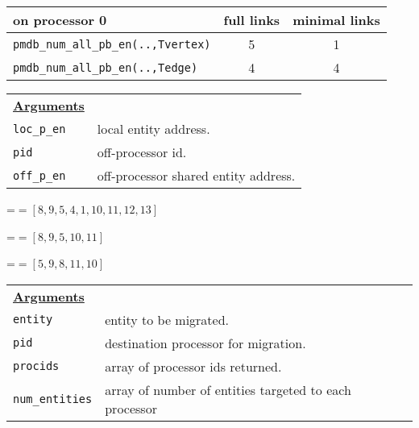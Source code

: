{\newpage
\clearpage
\samepage \begin{tabular}{|l|c|c|} \hline
on processor 0      & full links  & minimal links  \\  \hline \hline
{\tt pmdb\_num\_all\_pb\_en(..,Tvertex)} &  5  & 1   \\  \hline
{\tt pmdb\_num\_all\_pb\_en(..,Tedge)}   &  4  & 4   \\  \hline
\end{tabular}
}

{\newpage
\clearpage
\samepage \begin{tabular}{p{1.0in}p{4.9in}}
{\bf \underline{Arguments}} & \\  

{\tt loc\_p\_en}   &  local entity address. \\  
{\tt pid}          &  off-processor id. \\  
{\tt off\_p\_en}   &   off-processor shared entity address. \\  

\end{tabular}
}

{\newpage
\clearpage
\samepage \begin{figure}[htb]
\centerline{
\vbox{}
}
\label{lab_fig_gs}

\end{figure}
}

{\newpage
\clearpage
\samepage \setbox\sizebox=\hbox{$= [8,9,5,4,1,10,11,12,13]$}\box\sizebox
}

{\newpage
\clearpage
\samepage \setbox\sizebox=\hbox{$=[8,9,5,10,11]$}\box\sizebox
}

{\newpage
\clearpage
\samepage \setbox\sizebox=\hbox{$=[5,9,8,11,10]$}\box\sizebox
}

{\newpage
\clearpage
\samepage \begin{tabular}{p{1.0in}p{4.9in}}
{\bf \underline{Arguments}} & \\  

{\tt entity}        & entity to be migrated.               \\  
{\tt pid}           & destination processor for migration. \\  
{\tt procids}       & array of processor ids returned.     \\  
{\tt num\_entities} & array of number of entities targeted to each processor \\  

\end{tabular}
}

